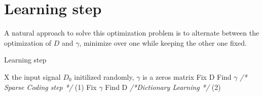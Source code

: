 \section{Learning step}
A natural approach to solve this optimization problem is to alternate between the optimization of $D$ and $\gamma$, minimize over one while keeping the other one fixed.\\
\begin{algorithm}
 \label{algo:algo1}

 \caption{Learning step}
 \begin{algorithmic}
 \REQUIRE X the input signal
    \STATE $D_0$ initilized randomly, $\gamma$  is a zeros matrix
        \STATE Fix D
        \STATE Find $\gamma$ \hspace{0.7cm} \textit{/* Sparse Coding step */}   (1)
        \STATE Fix $\gamma$
        \STATE Find D \hspace{0.7cm} \textit{/*Dictionary Learning  */} (2)
    \ENDWHILE
 \end{algorithmic}

\end{algorithm}

